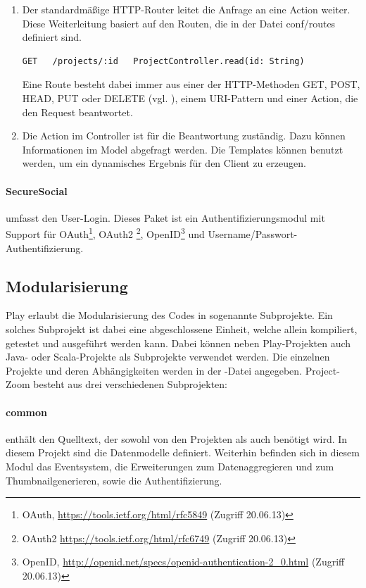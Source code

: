\begin{enumerate}
  \item Der standardmäßige HTTP-Router leitet die Anfrage an eine Action weiter. Diese Weiterleitung basiert auf den Routen, die in der Datei conf/routes definiert sind.
\begin{lstlisting}
GET   /projects/:id   ProjectController.read(id: String)
\end{lstlisting}
Eine Route besteht dabei immer aus einer der HTTP-Methoden GET, POST, HEAD, PUT oder DELETE (vgl. \cite{play-scala-routing}), einem URI-Pattern und einer Action, die den Request beantwortet.
\item Die Action im Controller ist für die Beantwortung zuständig. Dazu können Informationen im Model abgefragt werden. Die Templates können benutzt werden, um ein dynamisches Ergebnis für den Client zu erzeugen.
\end{enumerate}

\paragraph{SecureSocial} umfasst den User-Login. Dieses Paket ist ein Authentifizierungsmodul mit Support für OAuth\footnote{OAuth, \url{https://tools.ietf.org/html/rfc5849} (Zugriff 20.06.13)}, OAuth2 \footnote{OAuth2 \url{https://tools.ietf.org/html/rfc6749} (Zugriff 20.06.13)}, OpenID\footnote{OpenID, \url{http://openid.net/specs/openid-authentication-2_0.html} (Zugriff 20.06.13)} und Username/Passwort-Authentifizierung. 

\subsection{Modularisierung}
Play erlaubt die Modularisierung des Codes in sogenannte Subprojekte. Ein solches Subprojekt ist dabei eine abgeschlossene Einheit, welche allein kompiliert, getestet und ausgeführt werden kann. Dabei können neben Play-Projekten auch Java- oder Scala-Projekte als Subprojekte verwendet werden. Die einzelnen Projekte und deren Abhängigkeiten werden in der -Datei angegeben.
Project-Zoom besteht aus drei verschiedenen Subprojekten:

\paragraph{common} enthält den Quelltext, der sowohl von den Projekten  als auch  benötigt wird. In diesem Projekt sind die Datenmodelle definiert. Weiterhin befinden sich in diesem Modul das \gls{Eventsystem}, die Erweiterungen zum Datenaggregieren und zum \gls{Thumbnail}generieren, sowie die Authentifizierung.

